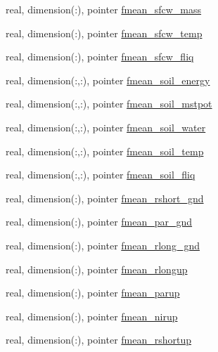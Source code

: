 \begin{DoxyCompactItemize}
\item 
real, dimension(\+:), pointer \hyperlink{structed__state__vars_1_1edtype_a8467b8ad09d114757a2a9a4815ebab70}{fmean\+\_\+sfcw\+\_\+mass}
\item 
real, dimension(\+:), pointer \hyperlink{structed__state__vars_1_1edtype_ae1c46da399cef81c53a5f67913b5e217}{fmean\+\_\+sfcw\+\_\+temp}
\item 
real, dimension(\+:), pointer \hyperlink{structed__state__vars_1_1edtype_a10c8b839932e9cf8b22311886d3196f1}{fmean\+\_\+sfcw\+\_\+fliq}
\item 
real, dimension(\+:,\+:), pointer \hyperlink{structed__state__vars_1_1edtype_adce3854b8cf3924f14ada861eeca37bc}{fmean\+\_\+soil\+\_\+energy}
\item 
real, dimension(\+:,\+:), pointer \hyperlink{structed__state__vars_1_1edtype_a78190dd8004d555735d6d5248f01e286}{fmean\+\_\+soil\+\_\+mstpot}
\item 
real, dimension(\+:,\+:), pointer \hyperlink{structed__state__vars_1_1edtype_a48fcfa941455256d25458dffaea7c29b}{fmean\+\_\+soil\+\_\+water}
\item 
real, dimension(\+:,\+:), pointer \hyperlink{structed__state__vars_1_1edtype_a9d0b368763e44c3f3b58d6e0a188730c}{fmean\+\_\+soil\+\_\+temp}
\item 
real, dimension(\+:,\+:), pointer \hyperlink{structed__state__vars_1_1edtype_ac3b0b1f42d449719f56ce68bea159306}{fmean\+\_\+soil\+\_\+fliq}
\item 
real, dimension(\+:), pointer \hyperlink{structed__state__vars_1_1edtype_a14bdc2c73489bb66e44e31f7b3812e4f}{fmean\+\_\+rshort\+\_\+gnd}
\item 
real, dimension(\+:), pointer \hyperlink{structed__state__vars_1_1edtype_a0f8460d48e26f96d53d3e5fb0ee8dd7c}{fmean\+\_\+par\+\_\+gnd}
\item 
real, dimension(\+:), pointer \hyperlink{structed__state__vars_1_1edtype_a8951b1cac850e38c9d3d9667378cd153}{fmean\+\_\+rlong\+\_\+gnd}
\item 
real, dimension(\+:), pointer \hyperlink{structed__state__vars_1_1edtype_ac24a224ad1abada3e8ac72b6ee06aa96}{fmean\+\_\+rlongup}
\item 
real, dimension(\+:), pointer \hyperlink{structed__state__vars_1_1edtype_ae92fe12d76615b302b94489d2a3bebe1}{fmean\+\_\+parup}
\item 
real, dimension(\+:), pointer \hyperlink{structed__state__vars_1_1edtype_a1748bdcf50023c9aa3153fac3b27c71f}{fmean\+\_\+nirup}
\item 
real, dimension(\+:), pointer \hyperlink{structed__state__vars_1_1edtype_ab42b13ceacac37a339c86acf0172dece}{fmean\+\_\+rshortup}

\end{DoxyCompactItemize}
